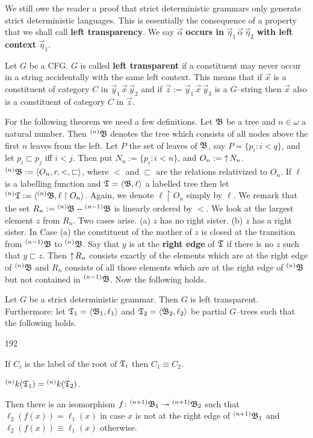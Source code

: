 We still owe the reader a proof that strict deterministic grammars 
only generate strict deterministic languages. This is essentially the
consequence of a property that we shall call
\textbf{left transparency}.
We say $\vec{\alpha}$ \textbf{occurs in} $\vec{\eta}_1\, \vec{\alpha}\,
\vec{\eta}_2$ \textbf{with left context} $\vec{\eta}_1$.
\begin{defn}
Let $G$ be a CFG. $G$ is called \textbf{left transparent}
if a constituent may never occur in a string accidentally
with the same left context. This means that
if $\vec{x}$ is a constituent of category $C$ in $\vec{y}_1 \, \vec{x}
\, \vec{y}_2$ and if $\vec{z} := \vec{y}_1 \, \vec{x} \, \vec{y}_3$
is a $G$--string then $\vec{x}$ also is a constituent
of category $C$ in $\vec{z}$.
\end{defn}
For the following theorem we need a few definitions.
Let $\mathfrak{B}$ be a tree and $n \in \omega$ a natural number.
Then ${^{(n)}\mathfrak{B}}$ denotes the tree which consists of all
nodes above the first $n$ leaves from the left. Let
$P$ the set of leaves of $\mathfrak{B}$, say $P = \{p_i : i < q\}$,
and let $p_i \sqsubset p_j$ iff $i < j$.
Then put $N_n := \{p_i : i < n\}$, and $O_n := {\uparrow\! N_n}$.
${^{(n)}\mathfrak{B}} := \langle O_n, r, <, \sqsubset\rangle$, where
$<$ and $\sqsubset$ are the relations relativized to
$O_n$. If $\ell$ is a labelling function and $\mathfrak{T} = \langle \mathfrak{B}, \ell\rangle$
a labelled tree then let ${^{(n)}\mathfrak{T}} := \langle {^{(n)}\mathfrak{B}},
\ell \restriction O_n\rangle$. Again, we denote $\ell \restriction
O_n$ simply by $\ell$. We remark that the set
$R_n := {^{(n)}\mathfrak{B}} - {^{(n-1)}\mathfrak{B}}$ is linearly ordered
by $<$.
We look at the largest element $z$ from $R_n$. Two
cases arise. (a) $z$ has no right sister.
(b) $z$ has a right sister. In Case (a) the constituent
of the mother of $z$ is closed at the transition from
${^{(n-1)}\mathfrak{B}}$ to ${^{(n)}\mathfrak{B}}$. Say that $y$ is at the
\textbf{right edge} of $\mathfrak{T}$ if there is no $z$ such that
$y \sqsubset z$. Then ${\uparrow\! R_n}$ consists exactly of the
elements which are at the right edge of ${^{(n)}\mathfrak{B}}$
and $R_n$ consists of all those elements which are at
the right edge of ${^{(n)}\mathfrak{B}}$ but not contained in
${^{(n-1)}\mathfrak{B}}$. Now the following holds.
\begin{prop}
\label{prop:lfp}
Let $G$ be a strict deterministic grammar. Then $G$
is left transparent. Furthermore: let $\mathfrak{T}_1 = \langle \mathfrak{B}_1, \ell_1\rangle$
and $\mathfrak{T}_2 = \langle \mathfrak{B}_2, \ell_2\rangle$ be partial $G$--trees
such that the following holds.
\begin{dingautolist}{192}
\item
    If $C_i$ is the label of the root of $\mathfrak{T}_i$ then
    $C_1 \equiv C_2$.
\item
    ${^{(n)}k(\mathfrak{T}_1)} = {^{(n)}k(\mathfrak{T}_2)}$.
\end{dingautolist}
Then there is an isomorphism $f \colon {^{(n+1)}\mathfrak{B}_1} \twoheadrightarrow {^{(n+1)}\mathfrak{B}_2}$
such that $\ell_2(f(x)) = \ell_1(x)$ in case $x$ is not at the
right edge of ${^{(n+1)}\mathfrak{B}_1}$ and $\ell_2(f(x)) \equiv \ell_1(x)$
otherwise.
\end{prop}
